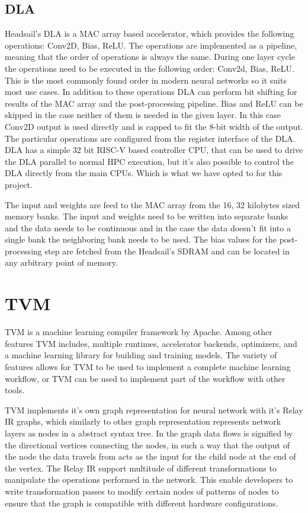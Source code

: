 \documentclass[12pt,a4paper,english
]{tunithesis}
\begin{document}
\subsection{DLA}
Headsail's DLA is a MAC array based accelerator, which provides the following operations: Conv2D, Bias, ReLU. The operations are implemented as a pipeline, meaning that the order of operations is always the same. During one layer cycle the operations need to be executed in the following order: Conv2d, Bias, ReLU. This is the most commonly found order in modern neural networks so it suits most use cases. In addition to these operations DLA can perform bit shifting for results of the MAC array and the post-processing pipeline.
Bias and ReLU can be skipped in the case neither of them is needed in the given layer. In this case Conv2D output is used directly and is capped to fit the 8-bit width of the output.
The particular operations are configured from the register interface of the DLA.
DLA has a simple 32 bit RISC-V based controller CPU, that can be used to drive the DLA parallel to normal HPC execution, but it's also possible to control the DLA directly from the main CPUs. Which is what we have opted to for this project.

The input and weights are feed to the MAC array from the 16, 32 kilobytes sized memory banks. The input and weights need to be written into separate banks and the data needs to be continuous and in the case the data doesn't fit into a single bank the neighboring bank needs to be used. The bias values for the post-processing step are fetched from the Headsail's SDRAM and can be located in any arbitrary point of memory.

\section{TVM}
TVM is a machine learning compiler framework by Apache. Among other features TVM includes, multiple runtimes, accelerator backends, optimizers, and a machine learning library for building and training models. The variety of features allows for TVM to be used to implement a complete machine learning workflow, or TVM can be used to implement part of the workflow with other tools.

TVM implements it's own graph representation for neural network with it's Relay IR graphs, which similarly to other graph representation represents network layers as nodes in a abstract syntax tree.
In the graph data flows is signified by the directional vertices connecting the nodes, in such a way that the output of the node the data travels from acts as the input for the child node at the end of the vertex. The Relay IR support multitude of different transformations to manipulate the operations performed in the network. This enable developers to write transformation passes to modify certain nodes of patterns of nodes to ensure that the graph is compatible with different hardware configurations.
\end{document}
